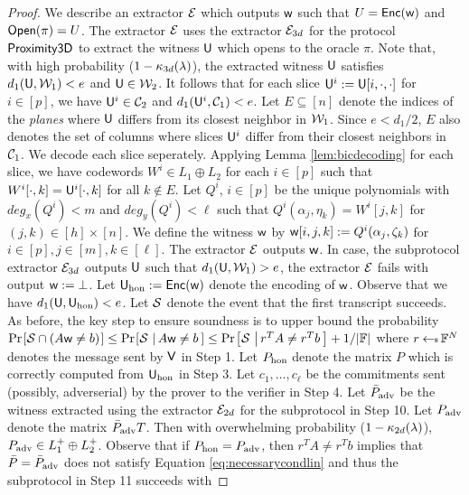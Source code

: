 \begin{proof}
We describe an extractor $\mathcal{E}$ which outputs $\mathsf{w}$ such that $U=\mathsf{Enc}(\mathsf{w})$
and $\mathsf{Open}(\pi)=U$. The extractor $\mathcal{E}$ uses the extractor $\mathcal{E}_{3d}$ for
the protocol $\mathsf{Proximity3D}$ to extract the witness $\mathsf{U}$ which opens to
the oracle $\pi$. Note that, with high probability ($1-\kappa_{3d}(\lambda)$),
the extracted witness $\mathsf{U}$ satisfies $d_1(\mathsf{U},\mathcal{W}_1)<e$ and $\mathsf{U}\in
\mathcal{W}_2$. It follows that for each slice $\mathsf{U}^i:=\mathsf{U}[i,\cdot,\cdot]$ for $i\in [p]$,
we have $\mathsf{U}^i\in \mathcal{C}_2$ and $d_1(\mathsf{U}^i,\mathcal{C}_1)<e$. Let $E\subseteq
[n]$ denote the indices of the {\em planes} where $\mathsf{U}$ differs from its closest
neighbor in $\mathcal{W}_1$. Since $e<d_1/2$, $E$ also denotes the set of columns
where slices $\mathsf{U}^i$ differ from their closest neighbors in $\mathcal{C}_1$. We
decode each slice seperately. Applying Lemma \ref{lem:bicdecoding} for each
slice, we have codewords $W^i\in L_1\oplus L_2$ for each $i\in [p]$ such that
$W^i[\cdot,k]=\mathsf{U}^i[\cdot,k]$ for all $k\not\in E$. Let $Q^i$, $i\in [p]$ be
the unique polynomials with $deg_x(Q^i)<m$ and $deg_y(Q^i)<\ell$ such that
$Q^i(\alpha_j,\eta_k)=W^i[j,k]$ for $(j,k)\in [h]\times [n]$. We define the
witness $\mathsf{w}$ by $\mathsf{w}[i,j,k] := Q^i(\alpha_j,\zeta_k)$ for $i\in [p],j\in
[m],k\in [\ell]$. The extractor $\mathcal{E}$ outputs $\mathsf{w}$. In case, the subprotocol extractor
$\mathcal{E}_{3d}$ outputs $\mathsf{U}$ such that $d_1(\mathsf{U},\mathcal{W}_1)>e$, the extractor
$\mathcal{E}$ fails with output $\mathsf{w} := \bot$. Let $\mathsf{U}_{\rm hon} := \mathsf{Enc}(\mathsf{w})$
denote the encoding of $\mathsf{w}$. Observe that we have $d_1(\mathsf{U},\mathsf{U}_{\rm
hon})<e$. Let $\mathcal{S}$ denote the event that the
first transcript succeeds. As before, the key step to ensure soundness is to
upper bound the probability $\prob{\mc{S}\cap (A\wit\neq b)}\leq
\condprob{\mc{S}}{A\wit\neq b}\leq \condprob{\mc{S}}{r^TA\neq r^Tb}+1/|\FF|$
where $r\hskip2.3pt{\gets\!\!\mbox{\tiny${\$}$\normalsize}}\, \mathbb{F}^N$ denotes the message sent by $\mathsf{V}$ in Step 1. Let
$P_{\rm hon}$ denote the matrix $P$ which is correctly computed from $\mathsf{U}_{\rm
hon}$ in
Step 3. Let $c_1,\ldots,c_{\ell}$ be the commitments sent (possibly,
adverserial) by the prover to the verifier in Step 4. Let $\bar{P}_{\rm adv}$ be the
witness extracted using the extractor $\mathcal{E}_{2d}$ for the subprotocol in Step
10. Let $P_{\rm adv}$ denote the matrix $\bar{P}_{\rm adv}T$. Then with overwhelming
probability ($1-\kappa_{2d}(\lambda)$), $P_{\rm adv}\in L^{+}_1\oplus L^{+}_2$. Observe
that if $P_{\rm hon}=P_{\rm adv}$, then $r^TA\neq r^Tb$ implies that
$\bar{P}=\bar{P}_{\rm adv}$ does not satisfy Equation
\eqref{eq:necessarycondlin} and thus the subprotocol in Step 11 succeeds with

\end{proof}
